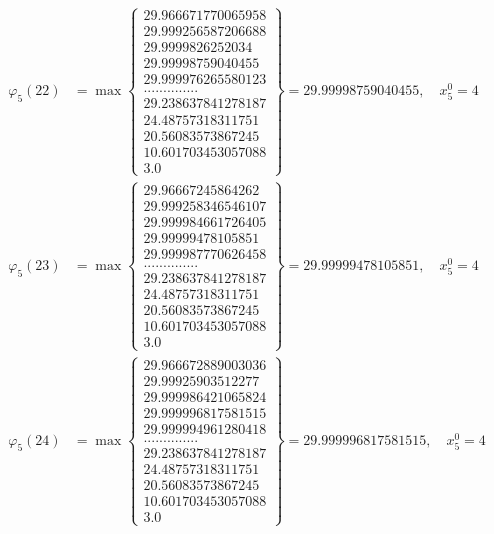 \documentclass{article}
\begin{document}
\begin{align*}
  
  
  
\varphi_{5}(22) &= \max \left\{ \begin{array}{c}
29.966671770065958 \\
 29.999256587206688 \\
 29.9999826252034 \\
 29.99998759040455 \\
 29.999976265580123 \\
 .............. \\
 29.238637841278187 \\
 24.48757318311751 \\
 20.56083573867245 \\
 10.601703453057088 \\
 3.0
\end{array} \right\} = 29.99998759040455, \quad x_{5}^0 = 4\\
  
  
  
  
\varphi_{5}(23) &= \max \left\{ \begin{array}{c}
29.96667245864262 \\
 29.999258346546107 \\
 29.999984661726405 \\
 29.99999478105851 \\
 29.999987770626458 \\
 .............. \\
 29.238637841278187 \\
 24.48757318311751 \\
 20.56083573867245 \\
 10.601703453057088 \\
 3.0
\end{array} \right\} = 29.99999478105851, \quad x_{5}^0 = 4\\
  
  
  
  
\varphi_{5}(24) &= \max \left\{ \begin{array}{c}
29.966672889003036 \\
 29.99925903512277 \\
 29.999986421065824 \\
 29.999996817581515 \\
 29.999994961280418 \\
 .............. \\
 29.238637841278187 \\
 24.48757318311751 \\
 20.56083573867245 \\
 10.601703453057088 \\
 3.0
\end{array} \right\} = 29.999996817581515, \quad x_{5}^0 = 4\\
  

\end{align*}
\end{document}
